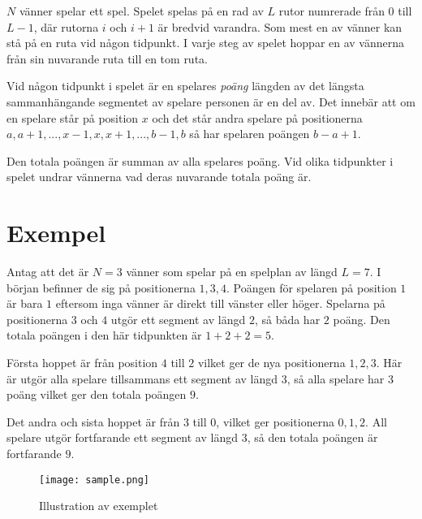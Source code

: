 \newcommand\version{v1}
$N$ vänner spelar ett spel. Spelet spelas på en rad av $L$ rutor numrerade från $0$ till $L - 1$, där rutorna $i$ och $i+1$ är bredvid varandra. Som mest en av vänner kan stå på en ruta vid någon tidpunkt. I varje steg av spelet hoppar en av vännerna från sin nuvarande ruta till en tom ruta.

Vid någon tidpunkt i spelet är en spelares \emph{poäng} längden av det längsta sammanhängande segmentet av spelare personen är en del av. Det innebär att om en spelare står på position $x$ och det står andra spelare på positionerna $a, a+1, ..., x-1, x, x+1, ..., b-1, b$ så har spelaren poängen $b - a + 1$.

Den totala poängen är summan av alla spelares poäng. Vid olika tidpunkter i spelet undrar vännerna vad deras nuvarande totala poäng är.


\section*{Exempel}
Antag att det är $N = 3$ vänner som spelar på en spelplan av längd $L = 7$. I början befinner de sig på positionerna
$1, 3, 4$. Poängen för spelaren på position $1$ är bara $1$ eftersom inga vänner är direkt till vänster eller höger.
Spelarna på positionerna $3$ och $4$ utgör ett segment av längd $2$, så båda har $2$ poäng. Den totala poängen i den här tidpunkten är $1 + 2 + 2 = 5$.

Första hoppet är från position $4$ till $2$ vilket ger de nya positionerna $1, 2, 3$. Här är utgör alla spelare tillsammans
ett segment av längd $3$, så alla spelare har $3$ poäng vilket ger den totala poängen $9$.

Det andra och sista hoppet är från $3$ till $0$, vilket ger positionerna $0, 1, 2$. All spelare utgör
fortfarande ett segment av längd $3$, så den totala poängen är fortfarande $9$.

\begin{figure}[h!]
  \centering
  \texttt{[image: sample.png]}
  \caption{Illustration av exemplet}
\end{figure}

